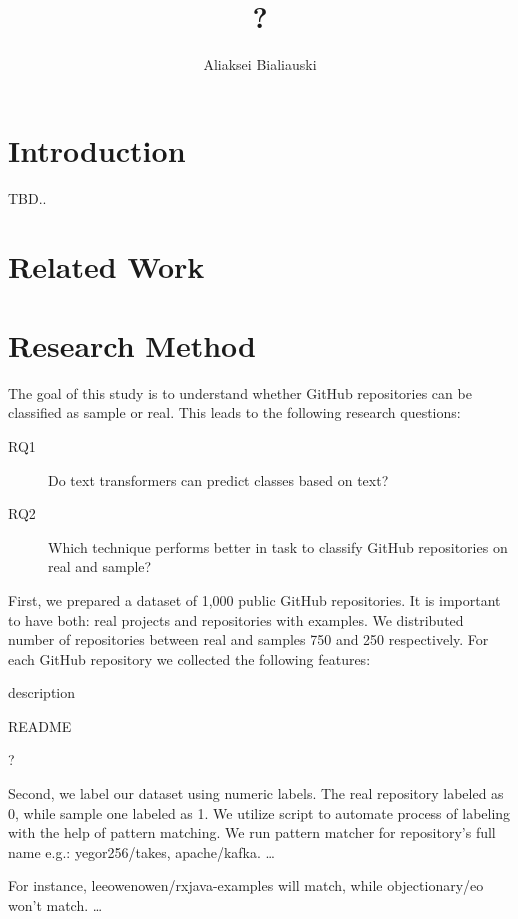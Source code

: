\documentclass[sigplan,nonacm,review]{acmart}
\title{?}
\author{Aliaksei Bialiauski}
\affiliation{
    \institution{?}
    \city{Minsk}
    \country{Belarus}
}
\begin{document}
\maketitle


\section{Introduction}\label{sec:introduction}
TBD.. \citet{testCitation}


\section{Related Work}\label{sec:related}


\section{Research Method}\label{sec:method}
The goal of this study is to understand whether GitHub repositories can be
classified as sample or real. This leads to the following research questions:
\begin{description}
    \item[RQ1] Do text transformers can predict classes based on text?
    \item[RQ2] Which technique performs better in task to classify GitHub repositories on real and sample?
\end{description}

First, we prepared a dataset of 1,000 public GitHub repositories.
It is important to have both: real projects and repositories with examples.
We distributed number of repositories between real and samples 750 and 250
respectively. For each GitHub repository we collected the following features:
\begin{inparaenum}[1)]
    \item description
    \item README
    \item ?
\end{inparaenum}

Second, we label our dataset using numeric labels. The real repository labeled
as 0, while sample one labeled as 1. We utilize script to automate process of
labeling with the help of pattern matching. We run pattern matcher for
repository's full name e.g.: yegor256/takes, apache/kafka. \ldots

For instance, leeowenowen/rxjava-examples will match, while objectionary/eo won't match.
\ldots
\end{document}
